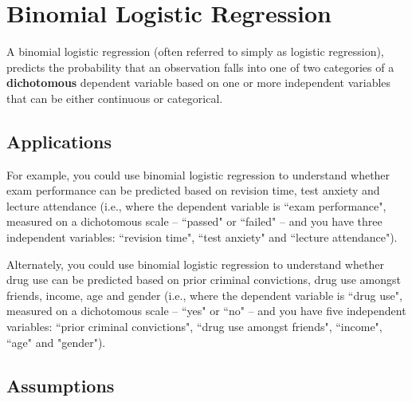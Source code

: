 \documentclass[12pt]{article}
\begin{document}
\section{Binomial Logistic Regression} 
A binomial logistic regression (often referred to simply as logistic regression), predicts the probability that an observation falls into one of two categories of a \textbf{dichotomous} dependent variable based on one or more independent variables that can be either continuous or categorical.

\subsection{Applications}
For example, you could use binomial logistic regression to understand whether exam performance can be predicted based on revision time, test anxiety and lecture attendance (i.e., where the dependent variable is ``exam performance", measured on a dichotomous scale – ``passed" or ``failed" – and you have three independent variables: ``revision time", ``test anxiety" and ``lecture attendance"). 


Alternately, you could use binomial logistic regression to understand whether drug use can be predicted based on prior criminal convictions, drug use amongst friends, income, age and gender (i.e., where the dependent variable is ``drug use", measured on a dichotomous scale – ``yes" or ``no" – and you have five independent variables: ``prior criminal convictions", ``drug use amongst friends", ``income", ``age" and "gender").
\newpage
\subsection{Assumptions}
\end{document}
